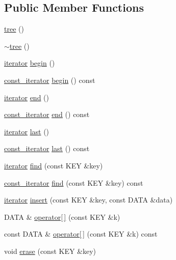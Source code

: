 \subsection*{Public Member Functions}
\begin{DoxyCompactItemize}
\item 
\hyperlink{classfm_1_1tree_a40b5a0222169e4680bdf9ac301e068e6}{tree} ()
\item 
\hyperlink{classfm_1_1tree_ab1567e75f916ca111923c69a72c4579a}{$\sim$tree} ()
\item 
\hyperlink{classfm_1_1tree_1_1iterator}{iterator} \hyperlink{classfm_1_1tree_aa7c4c9e11d1c788d0c9c8c88bcf5575f}{begin} ()
\item 
\hyperlink{classfm_1_1tree_1_1const__iterator}{const\_\-iterator} \hyperlink{classfm_1_1tree_a9fe55c22449705c0ac187d2f703a570f}{begin} () const 
\item 
\hyperlink{classfm_1_1tree_1_1iterator}{iterator} \hyperlink{classfm_1_1tree_aec72096841b5c1b16ec8f584990fc8cb}{end} ()
\item 
\hyperlink{classfm_1_1tree_1_1const__iterator}{const\_\-iterator} \hyperlink{classfm_1_1tree_aebd32d6c1fb6b8a17846389f17f7f740}{end} () const 
\item 
\hyperlink{classfm_1_1tree_1_1iterator}{iterator} \hyperlink{classfm_1_1tree_a5a6bf6ac74b225026c87e10cfe01aeee}{last} ()
\item 
\hyperlink{classfm_1_1tree_1_1const__iterator}{const\_\-iterator} \hyperlink{classfm_1_1tree_a4718a67fbef31d9140a2a2c0d3dbebbd}{last} () const 
\item 
\hyperlink{classfm_1_1tree_1_1iterator}{iterator} \hyperlink{classfm_1_1tree_a81948231a919b25a85331a8f3d4e805b}{find} (const KEY \&key)
\item 
\hyperlink{classfm_1_1tree_1_1const__iterator}{const\_\-iterator} \hyperlink{classfm_1_1tree_a9a78516786b1418717e6de2307fe5fb8}{find} (const KEY \&key) const 
\item 
\hyperlink{classfm_1_1tree_1_1iterator}{iterator} \hyperlink{classfm_1_1tree_addd6b9b977d1fc92381b08b1d03dff7a}{insert} (const KEY \&key, const DATA \&data)
\item 
DATA \& \hyperlink{classfm_1_1tree_ae05c24532b73dd82733d739c47608365}{operator\mbox{[}$\,$\mbox{]}} (const KEY \&k)
\item 
const DATA \& \hyperlink{classfm_1_1tree_af7ef9c5d48222e86155e88be0d85be00}{operator\mbox{[}$\,$\mbox{]}} (const KEY \&k) const 
\item 
void \hyperlink{classfm_1_1tree_a89ab3fd9fee9e91e3f4a83a72b44e4b6}{erase} (const KEY \&key)

\end{DoxyCompactItemize}
